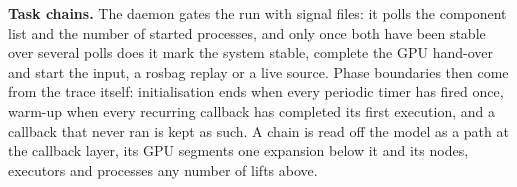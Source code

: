 \noindent\textbf{Task chains.} The daemon gates the run with signal files: it polls the component list and the number of started processes, and only once both have been stable over several polls does it mark the system stable, complete the GPU hand-over and start the input, a rosbag replay or a live source. Phase boundaries then come from the trace itself: initialisation ends when every periodic timer has fired once, warm-up when every recurring callback has completed its first execution, and a callback that never ran is kept as such. A chain is read off the model as a path at the callback layer, its GPU segments one expansion below it and its nodes, executors and processes any number of lifts above.
